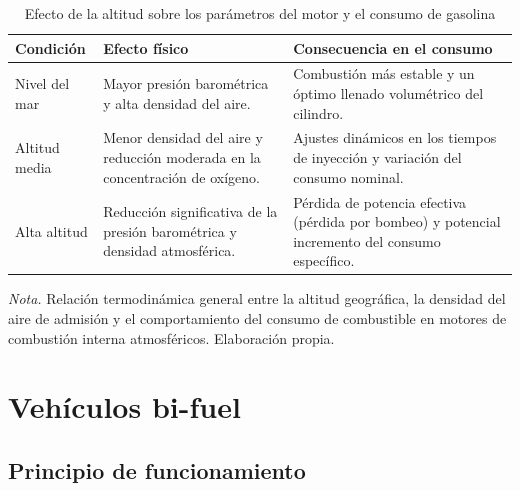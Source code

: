 \begin{table}[h]
	\centering
	\captionsetup{labelformat=simple, labelsep=newline, textfont=it, labelfont=bf}
	\caption{Efecto de la altitud sobre los parámetros del motor y el consumo de gasolina}
	\label{tab:altitud}
	\vspace{0.3cm}
	
	\begin{tabularx}{\linewidth}{p{3.0cm} X X}
		\toprule %
		\rowcolor[rgb]{0.851, 0.851, 0.851}
		\textbf{Condición} & \textbf{Efecto físico} & \textbf{Consecuencia en el consumo} \\
		\midrule %
		Nivel del mar & Mayor presión barométrica y alta densidad del aire. & Combustión más estable y un óptimo llenado volumétrico del cilindro. \\
		\addlinespace
		Altitud media & Menor densidad del aire y reducción moderada en la concentración de oxígeno. & Ajustes dinámicos en los tiempos de inyección y variación del consumo nominal. \\
		\addlinespace
		Alta altitud & Reducción significativa de la presión barométrica y densidad atmosférica. & Pérdida de potencia efectiva (pérdida por bombeo) y potencial incremento del consumo específico. \\
		\bottomrule %
	\end{tabularx}
	\vspace{0.2cm}
	
	\begin{flushleft}
		\footnotesize \textit{Nota.} Relación termodinámica general entre la altitud geográfica, la densidad del aire de admisión y el comportamiento del consumo de combustible en motores de combustión interna atmosféricos. Elaboración propia.
	\end{flushleft}
\end{table}

\section{Vehículos bi-fuel}

\subsection{Principio de funcionamiento}

